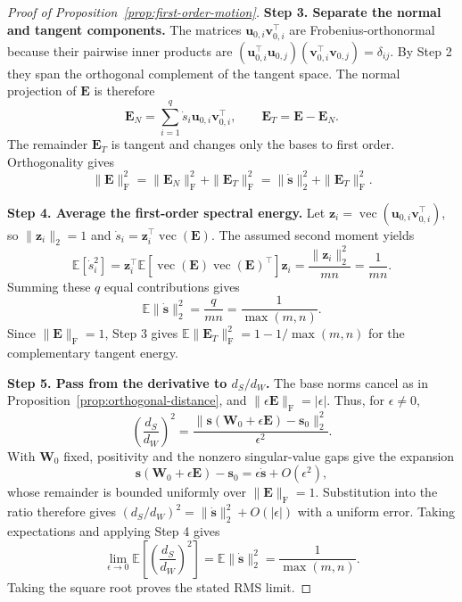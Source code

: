 \begin{proof}[Proof of Proposition~\ref{prop:first-order-motion}]
\textbf{Step 3. Separate the normal and tangent components.} The matrices $\bm u_{0,i}\bm v_{0,i}^{\!\top}$ are Frobenius-orthonormal because their pairwise inner products are $(\bm u_{0,i}^{\!\top}\bm u_{0,j})(\bm v_{0,i}^{\!\top}\bm v_{0,j})=\delta_{ij}$. By Step 2 they span the orthogonal complement of the tangent space. The normal projection of $\bm E$ is therefore
\begin{equation*}
\bm E_N=\sum_{i=1}^q\dot s_i\bm u_{0,i}\bm v_{0,i}^{\!\top},\qquad
\bm E_T=\bm E-\bm E_N.
\end{equation*}
The remainder $\bm E_T$ is tangent and changes only the bases to first order. Orthogonality gives
\begin{equation*}
\|\bm E\|_{\mathrm F}^2=\|\bm E_N\|_{\mathrm F}^2+\|\bm E_T\|_{\mathrm F}^2
=\|\dot{\bm s}\|_2^2+\|\bm E_T\|_{\mathrm F}^2.
\end{equation*}

\textbf{Step 4. Average the first-order spectral energy.} Let $\bm z_i=\operatorname{vec}(\bm u_{0,i}\bm v_{0,i}^{\!\top})$, so $\|\bm z_i\|_2=1$ and $\dot s_i=\bm z_i^{\!\top}\operatorname{vec}(\bm E)$. The assumed second moment yields
\begin{equation*}
\mathbb E[\dot s_i^2]
=\bm z_i^{\!\top}\mathbb E[\operatorname{vec}(\bm E)\operatorname{vec}(\bm E)^{\!\top}]\bm z_i
=\frac{\|\bm z_i\|_2^2}{mn}=\frac{1}{mn}.
\end{equation*}
Summing these $q$ equal contributions gives
\begin{equation*}
\mathbb E\|\dot{\bm s}\|_2^2=\frac{q}{mn}=\frac{1}{\max(m,n)}.
\end{equation*}
Since $\|\bm E\|_{\mathrm F}=1$, Step 3 gives $\mathbb E\|\bm E_T\|_{\mathrm F}^2=1-1/\max(m,n)$ for the complementary tangent energy.

\textbf{Step 5. Pass from the derivative to $d_S/d_W$.} The base norms cancel as in Proposition~\ref{prop:orthogonal-distance}, and $\|\epsilon\bm E\|_{\mathrm F}=|\epsilon|$. Thus, for $\epsilon\neq0$,
\begin{equation*}
\left(\frac{d_S}{d_W}\right)^2=\frac{\|\bm s(\bm W_0+\epsilon\bm E)-\bm s_0\|_2^2}{\epsilon^2}.
\end{equation*}
With $\bm W_0$ fixed, positivity and the nonzero singular-value gaps give the expansion
\begin{equation*}
\bm s(\bm W_0+\epsilon\bm E)-\bm s_0=\epsilon\dot{\bm s}+O(\epsilon^2),
\end{equation*}
whose remainder is bounded uniformly over $\|\bm E\|_{\mathrm F}=1$. Substitution into the ratio therefore gives $(d_S/d_W)^2=\|\dot{\bm s}\|_2^2+O(|\epsilon|)$ with a uniform error. Taking expectations and applying Step 4 gives
\begin{equation*}
\lim_{\epsilon\to0}\mathbb E\left[\left(\frac{d_S}{d_W}\right)^2\right]
=\mathbb E\|\dot{\bm s}\|_2^2=\frac{1}{\max(m,n)}.
\end{equation*}
Taking the square root proves the stated RMS limit.
\end{proof}

